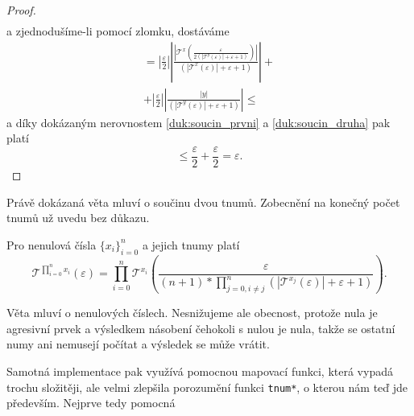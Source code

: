 \begin{theorem}
\begin{proof}
\begin{equation}
\begin{split}
\end{split}
\end{equation}
a zjednodušíme-li pomocí zlomku, dostáváme
\begin{equation}
\begin{split}
= |\frac{\varepsilon}{2}||\frac{|\mathcal{T}^x\left(\frac{\varepsilon}{2(|\mathcal{T}^y(\varepsilon)|+\varepsilon +1)}\right)|}{(|\mathcal{T}^x(\varepsilon)|+\varepsilon +1)}|+\\+|\frac{\varepsilon}{2}||\frac{|y|}{(|\mathcal{T}^y(\varepsilon)|+\varepsilon +1)}|\leq
\end{split}
\end{equation}
a díky dokázaným nerovnostem \ref{duk:soucin_prvni} a \ref{duk:soucin_druha} pak platí
\begin{equation}
\leq\frac{\varepsilon}{2}+\frac{\varepsilon}{2}=\varepsilon.
\end{equation}
\end{proof}
\end{theorem}

Právě dokázaná věta mluví o součinu dvou tnumů. Zobecnění na konečný počet tnumů už uvedu bez důkazu.

\begin{fact}\label{vet:soucin_tnumu}
Pro nenulová čísla $\{x_i\}_{i=0}^{n}$ a jejich tnumy platí
\begin{equation}
\mathcal{T}^{\prod_{i=0}^nx_i}(\varepsilon)=\prod_{i=0}^n\mathcal{T}^{x_i}\left(\frac{\varepsilon}{(n+1)*\prod_{j=0, i\neq j}^n(|\mathcal{T}^{x_j}(\varepsilon)|+\varepsilon +1)}\right).
\end{equation}
\end{fact}

Věta mluví o nenulových číslech. Nesnižujeme ale obecnost, protože nula je agresivní prvek a výsledkem násobení čehokoli s nulou je nula, takže se ostatní numy ani nemusejí počítat a výsledek se může vrátit.

Samotná implementace pak využívá pomocnou mapovací funkci, která vypadá trochu složitěji, ale velmi zlepšila porozumění funkci \texttt{tnum*}, o kterou nám teď jde především. Nejprve tedy pomocná

